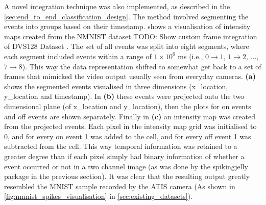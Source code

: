  A novel integration technique was also implemented, as described in the \cref{sec:end_to_end_classification_design}. The method involved segmenting the events into groups based on their timestamp.  shows a visualisation of intensity maps created from the NMNIST\cite{NMNIST} dataset \color{red} TODO: Show custom frame integration of DVS128 Dataset \color{black}. The set of all events was split into eight segments, where each segment included events within a range of $ 1 \times 10^6 $ ms (i.e., $ 0 \rightarrow 1 $, $ 1 \rightarrow 2 $, ..., $ 7 \rightarrow 8 $). This way the data representation shifted to somewhat get back to a set of frames that mimicked the video output usually seen from everyday cameras. \textbf{(a)} shows the segmented events visualised in three dimensions (x\_location, y\_location and timestamp). In \textbf{(b)} these events were projected onto the two dimensional plane (of x\_location and y\_location), then the plots for on events and off events are shown separately. Finally in \textbf{(c)} an intensity map was created from the projected events. Each pixel in the intensity map grid was initialised to 0, and for every on event 1 was added to the cell, and for every off event 1 was subtracted from the cell. This way temporal information was retained to a greater degree than if each pixel simply had binary information of whether a event occurred or not in a two channel image (as was done by the spikingjelly package\cite{SpikingJelly} in the previous section). It was clear that the resulting output greatly resembled the MNIST\cite{MNIST} sample recorded by the ATIS camera (As shown in \cref{fig:nmnist_spikes_visualisation} in \cref{sec:existing_datasets}).

